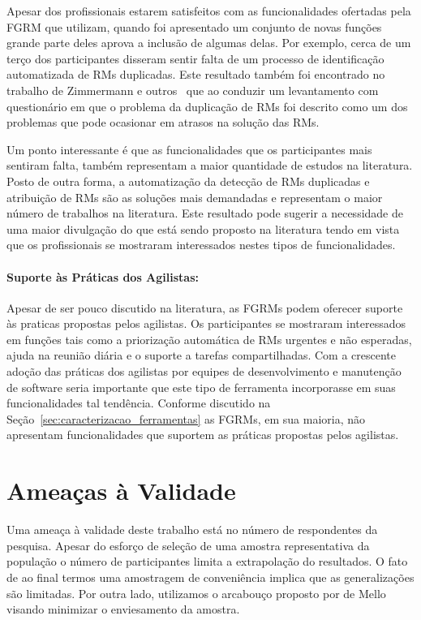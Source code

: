 Apesar dos profissionais estarem satisfeitos com as funcionalidades ofertadas
pela FGRM que utilizam, quando foi apresentado um conjunto de novas funções
grande parte deles aprova a inclusão de algumas delas. Por exemplo, cerca de um
terço dos participantes disseram sentir falta de um processo de identificação
automatizada de RMs duplicadas. Este resultado também foi encontrado no
trabalho de Zimmermann e outros~\cite{zimmermann2010makes} que ao conduzir um
levantamento com questionário em que o problema da duplicação de RMs foi
descrito como um dos problemas que pode ocasionar em atrasos na solução das
RMs.

Um ponto interessante é que as funcionalidades que os participantes mais
sentiram falta, também representam a maior quantidade de estudos na literatura.
Posto de outra forma, a automatização da detecção de RMs duplicadas e
atribuição de RMs são as soluções mais demandadas e representam o maior número
de trabalhos na literatura. Este resultado pode sugerir a necessidade de uma
maior divulgação do que está sendo proposto na literatura tendo em vista que os
profissionais se mostraram interessados nestes tipos de funcionalidades.

\paragraph{Suporte às Práticas dos Agilistas:}\label{par:pesq_profissionais_suporte_pratica_agilistas}

Apesar de ser pouco discutido na literatura, as FGRMs podem oferecer suporte às
praticas propostas pelos agilistas. Os participantes se mostraram interessados
em funções tais como a priorização automática de RMs urgentes e não esperadas,
ajuda na reunião diária e o suporte a tarefas compartilhadas. Com a crescente
adoção das práticas dos agilistas por equipes de desenvolvimento e manutenção de
software seria importante que este tipo de ferramenta incorporasse em suas
funcionalidades tal tendência. Conforme discutido na
Seção~\ref{sec:caracterizacao_ferramentas} as FGRMs, em sua maioria, não
apresentam funcionalidades que suportem as práticas propostas pelos agilistas.

\section{Ameaças à Validade}\label{sec:pesquisa_profissionais_ameacas_validade}

Uma ameaça à validade deste trabalho está no número de respondentes da pesquisa.
Apesar do esforço de seleção de uma amostra representativa da população o número
de participantes limita a extrapolação do resultados. O fato de ao final termos
uma amostragem de conveniência implica que as generalizações são limitadas. Por
outra lado, utilizamos o arcabouço proposto por de Mello~\cite{de2014towards}
visando minimizar o enviesamento da amostra.

